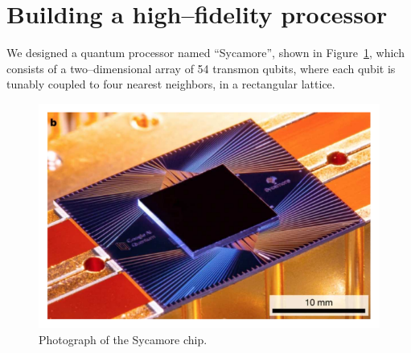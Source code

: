 \section{Building a high--fidelity processor}
\label{sec:processor}
%
%
We designed a quantum processor named ``Sycamore'', shown in
Figure~\ref{fig:sycamore_processor}, which consists of a two--dimensional array
of 54 transmon qubits, where each qubit is tunably coupled to four nearest
neighbors, in a rectangular lattice.

%
%
%
%
%
%
%
%
\begin{figure}[t]
  \centering
  \includegraphics[scale=0.8]{img/sycamore.pdf}
  \caption{Photograph of the Sycamore chip.}
  \label{fig:sycamore_processor}
\end{figure}

